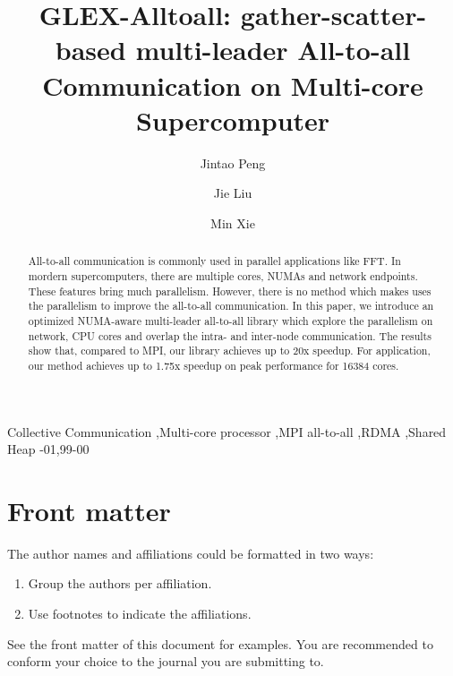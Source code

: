 \documentclass[5p,times]{elsarticle}
\begin{document}
\begin{frontmatter}

\title{GLEX-Alltoall: gather-scatter-based multi-leader All-to-all Communication on Multi-core Supercomputer}

\author{Jintao Peng}
\author{Jie Liu}
\author{Min Xie}

\address{Changsha, China}



\begin{abstract}
		All-to-all communication is commonly used in parallel applications like FFT. 
		In mordern supercomputers, there are multiple cores, NUMAs and network endpoints. 
		These features bring much parallelism. 
		However, there is no method which makes uses the parallelism to improve the all-to-all communication. 
		In this paper, we introduce an optimized NUMA-aware multi-leader all-to-all library which explore the parallelism on network, CPU cores and overlap the intra- and inter-node communication. 
		The results show that, compared to MPI, our library achieves up to 20x speedup. 
		For application, our method achieves up to 1.75x speedup on peak performance for 16384 cores.
\end{abstract}

\begin{keyword}
 Collective Communication \sep Multi-core processor \sep MPI all-to-all \sep RDMA \sep Shared Heap
-01\sep  99-00
\end{keyword}

\end{frontmatter}

\linenumbers






\section{Front matter}

The author names and affiliations could be formatted in two ways:
\begin{enumerate}[(1)]
\item Group the authors per affiliation.
\item Use footnotes to indicate the affiliations.
\end{enumerate}
See the front matter of this document for examples. You are recommended to conform your choice to the journal you are submitting to.
\end{document}
